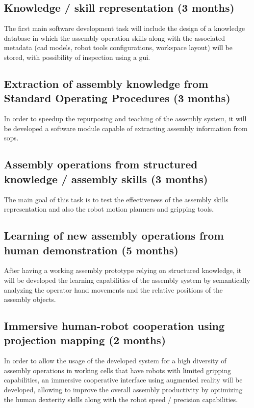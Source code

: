 \subsection{Knowledge / skill representation (3 months)}

The first main software development task will include the design of a knowledge database in which the assembly operation skills along with the associated metadata (\gls{cad} models, robot tools configurations, workspace layout) will be stored, with possibility of inspection using a \gls{gui}.


\subsection{Extraction of assembly knowledge from Standard Operating Procedures (3 months)}

In order to speedup the repurposing and teaching of the assembly system, it will be developed a software module capable of extracting assembly information from \glspl{sop}.


\subsection{Assembly operations from structured knowledge / assembly skills (3 months)}

The main goal of this task is to test the effectiveness of the assembly skills representation and also the robot motion planners and gripping tools.


\subsection{Learning of new assembly operations from human demonstration (5 months)}

After having a working assembly prototype relying on structured knowledge, it will be developed the learning capabilities of the assembly system by semantically analyzing the operator hand movements and the relative positions of the assembly objects.


\subsection{Immersive human-robot cooperation using projection mapping (2 months)}

In order to allow the usage of the developed system for a high diversity of assembly operations in working cells that have robots with limited gripping capabilities, an immersive cooperative interface using augmented reality will be developed, allowing to improve the overall assembly productivity by optimizing the human dexterity skills along with the robot speed / precision capabilities.


